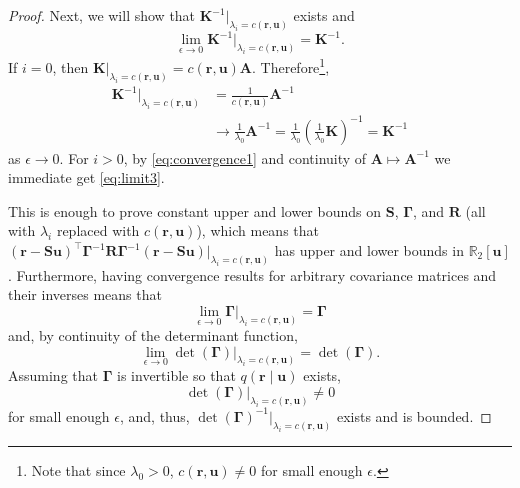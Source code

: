 \documentclass{mpaper}
\begin{document}
\begin{proof}
  Next, we will show that $\mathbf{K}^{-1}|_{\lambda_i = c(\mathbf{r},
    \mathbf{u})}$ exists and
  \begin{equation} \label{eq:limit3}
    \lim_{\epsilon \to 0} \mathbf{K}^{-1}|_{\lambda_i = c(\mathbf{r},
      \mathbf{u})} = \mathbf{K}^{-1}.
  \end{equation}
  If $i = 0$, then $\mathbf{K}|_{\lambda_i = c(\mathbf{r}, \mathbf{u})} =
  c(\mathbf{r}, \mathbf{u})\mathbf{A}$. Therefore\footnote{Note that since
    $\lambda_0 > 0$, $c(\mathbf{r}, \mathbf{u}) \ne 0$ for small enough
    $\epsilon$.},
  \begin{align*}
    \mathbf{K}^{-1}|_{\lambda_i = c(\mathbf{r}, \mathbf{u})} &=
                                                               \frac{1}{c(\mathbf{r}, \mathbf{u})}\mathbf{A}^{-1} \\
                                                             &\to \frac{1}{\lambda_0}\mathbf{A}^{-1} = \frac{1}{\lambda_0} \left( \frac{1}{\lambda_0}\mathbf{K} \right)^{-1} = \mathbf{K}^{-1}
  \end{align*}
  as $\epsilon \to 0$. For $i > 0$, by \eqref{eq:convergence1} and continuity of
  $\mathbf{A} \mapsto \mathbf{A}^{-1}$ we immediate get \eqref{eq:limit3}.

  This is enough to prove constant upper and lower bounds on
  $\mathbf{S}$, $\bm\Gamma$, and $\mathbf{R}$ (all with $\lambda_i$ replaced
  with $c(\mathbf{r}, \mathbf{u})$), which means that $(\mathbf{r} -
  \mathbf{Su})^\intercal\bm\Gamma^{-1}\mathbf{R}\bm\Gamma^{-1}(\mathbf{r} -
  \mathbf{Su})|_{\lambda_i = c(\mathbf{r}, \mathbf{u})}$ has upper and lower
  bounds in $\mathbb{R}_2[\mathbf{u}]$. Furthermore, having convergence results
  for arbitrary covariance matrices and their inverses means that
  \begin{equation} \label{eq:gamma_convergence}
    \lim_{\epsilon \to 0} \bm\Gamma|_{\lambda_i = c(\mathbf{r}, \mathbf{u})} =
    \bm\Gamma
  \end{equation}
  and, by continuity of the determinant function,
  \begin{equation} \label{eq:det_gamma}
    \lim_{\epsilon \to 0} \det(\bm\Gamma)|_{\lambda_i = c(\mathbf{r}, \mathbf{u})} =
    \det(\bm\Gamma).
  \end{equation}
  Assuming that
  $\bm\Gamma$ is invertible so that $q(\mathbf{r} \mid \mathbf{u})$ exists,
  \[
    \det(\bm\Gamma)|_{\lambda_i = c(\mathbf{r}, \mathbf{u})} \ne 0
  \]
  for small enough $\epsilon$, and, thus, $\det(\bm\Gamma)^{-1}|_{\lambda_i =
    c(\mathbf{r}, \mathbf{u})}$ exists and is bounded.
  

\end{proof}
\end{document}
